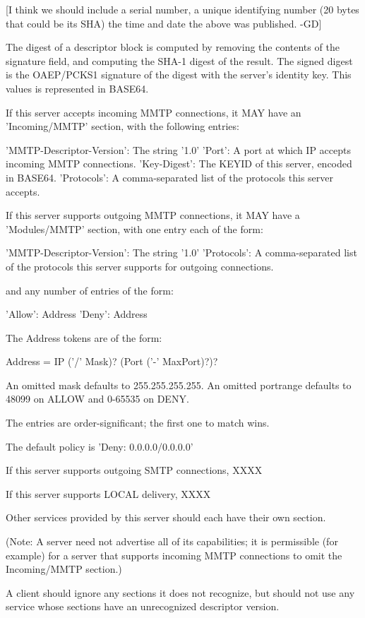 [I think we should include a serial number, a unique identifying
number (20 bytes that could be its SHA) the time and date the above
was published. -GD]

The digest of a descriptor block is computed by removing the contents
of the signature field, and computing the SHA-1 digest of
the result.  The signed digest is the OAEP/PCKS1 signature of the
digest with the server's identity key.  This values is
represented in BASE64.

If this server accepts incoming MMTP connections, it MAY have an
'Incoming/MMTP' section, with the following entries:

     'MMTP-Descriptor-Version': The string '1.0'
     'Port': A port at which IP accepts incoming MMTP connections.
     'Key-Digest': The KEYID of this server, encoded in BASE64.
     'Protocols': A comma-separated list of the protocols this
           server accepts.

If this server supports outgoing MMTP connections, it MAY have a
'Modules/MMTP' section, with one entry each of the form:

      'MMTP-Descriptor-Version': The string '1.0'
      'Protocols': A comma-separated list of the protocols this server
           supports for outgoing connections.

and any number of entries of the form:

      'Allow': Address
      'Deny': Address

The Address tokens are of the form:

   Address = IP ('/' Mask)? (Port ('-' MaxPort)?)?

An omitted mask defaults to 255.255.255.255.  An omitted portrange
defaults to 48099 on ALLOW and 0-65535 on DENY.

The entries are order-significant; the first one to match wins.

The default policy is 'Deny: 0.0.0.0/0.0.0.0'

If this server supports outgoing SMTP connections, XXXX

If this server supports LOCAL delivery, XXXX

Other services provided by this server should each have their own section.

(Note: A server need not advertise all of its capabilities; it is
permissible (for example) for a server that supports incoming MMTP
connections to omit the Incoming/MMTP section.)

A client should ignore any sections it does not recognize, but should
not use any service whose sections have an unrecognized descriptor
version.

